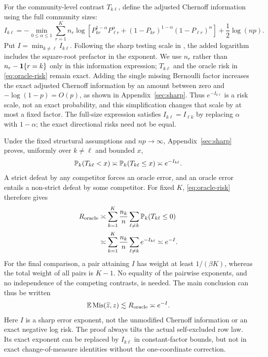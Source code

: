For the community-level contrast $T_{k\ell}$, define the adjusted
Chernoff information using the full community sizes:
\[
 I_{k\ell}=-\min_{0\le\alpha\le1}\sum_{r=1}^K n_{r}
 \log\!\left[P_{kr}^{1-\alpha}P_{\ell r}^\alpha
 +(1-P_{kr})^{1-\alpha}(1-P_{\ell r})^\alpha\right]
 +\frac12\log(np).
\]
Put $I=\min_{k\ne\ell}I_{k\ell}$. Following the sharp testing scale
in \citet{zhouli}, the added logarithm includes the square-root
prefactor in the exponent. We use $n_{r}$ rather than
$n_{r}-\mathbf1\{r=k\}$ only in this information expression;
$T_{k\ell}$ and the oracle risk in \eqref{eq:oracle-risk} remain exact.
Adding the single missing Bernoulli factor increases the exact adjusted
Chernoff information by an amount between zero and
$-\log(1-p)=O(p)$, as shown in Appendix~\ref{sec:sharp}.
Thus $e^{-I_{k\ell}}$ is a risk scale, not an exact probability, and
this simplification changes that scale by at most a fixed factor.
The full-size expression satisfies $I_{k\ell}=I_{\ell k}$ by
replacing $\alpha$ with $1-\alpha$; the exact directional risks need
not be equal.

Under the fixed structural assumptions and $np\to\infty$,
Appendix~\ref{sec:sharp} proves, uniformly over $k\ne\ell$ and
bounded $x$,
\[
 \mathbb P_k(T_{k\ell}<x)\asymp
 \mathbb P_k(T_{k\ell}\le x)\asymp e^{-I_{k\ell}}.
\]
A strict defeat by any competitor forces an oracle error, and an
oracle error entails a non-strict defeat by some competitor. For
fixed $K$, \eqref{eq:oracle-risk} therefore gives
\begin{equation}\label{eq:oracle-scale-comparison}
 \begin{aligned}
 R_{\mathrm{oracle}}
 &\asymp\sum_{k=1}^K\frac{n_k}{n}
              \sum_{\ell\ne k}\mathbb P_k(T_{k\ell}\le0)\\
 &\asymp\sum_{k=1}^K\frac{n_k}{n}
              \sum_{\ell\ne k}e^{-I_{k\ell}}
 \asymp e^{-I}.
 \end{aligned}
\end{equation}
For the final comparison, a pair attaining $I$ has weight at least
$1/(\beta K)$, whereas the total weight of all pairs is $K-1$.
No equality of the pairwise exponents, and no independence of the
competing contrasts, is needed. The main conclusion can thus be written
\[
 \mathbb E\operatorname{Mis}(\widehat z,z)\lesssim R_{\mathrm{oracle}}\asymp e^{-I}.
\]
Here $I$ is a sharp error exponent, not the unmodified Chernoff
information or an exact negative log risk. The proof always tilts the
actual self-excluded row law. Its exact exponent can be replaced by
$I_{k\ell}$ in constant-factor bounds, but not in exact
change-of-measure identities without the one-coordinate correction.

